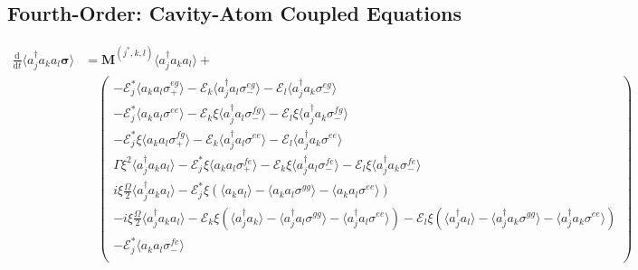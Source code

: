 \documentclass{article}
\newcommand{\ddt}{\frac{\mathrm{d}}{\mathrm{d}t}}
\begin{document}
\subsection{Fourth-Order: Cavity-Atom Coupled Equations}

\begin{subequations}
\begin{align}
	\ddt \langle a^{\dagger}_{j} a_{k} a_{l} \bm{\sigma} \rangle &= \bm{M}^{(j^{*}, k, l)} \langle a^{\dagger}_{j} a_{k} a_{l} \rangle + \nonumber \\
	&\quad
	\begin{pmatrix}
		-\mathcal{E}_{j}^{*} \langle a_{k} a_{l} \sigma^{eg}_{+} \rangle - \mathcal{E}_{k} \langle a^{\dagger}_{j} a_{l} \sigma^{eg}_{-} \rangle - \mathcal{E}_{l} \langle a^{\dagger}_{j} a_{k} \sigma^{eg}_{-} \rangle \\
		-\mathcal{E}_{j}^{*} \langle a_{k} a_{l} \sigma^{ee} \rangle - \mathcal{E}_{k} \xi \langle a^{\dagger}_{j} a_{l} \sigma^{fg}_{-} \rangle - \mathcal{E}_{l} \xi \langle a^{\dagger}_{j} a_{k} \sigma^{fg}_{-} \rangle \\
		-\mathcal{E}_{j}^{*} \xi \langle a_{k} a_{l} \sigma^{fg}_{+} \rangle - \mathcal{E}_{k} \langle a^{\dagger}_{j} a_{l} \sigma^{ee} \rangle - \mathcal{E}_{l} \langle a^{\dagger}_{j} a_{k} \sigma^{ee} \rangle \\
		\Gamma \xi^{2} \langle a^{\dagger}_{j} a_{k} a_{l} \rangle - \mathcal{E}_{j}^{*} \xi \langle a_{k} a_{l} \sigma^{fe}_{+} \rangle - \mathcal{E}_{k} \xi \langle a^{\dagger}_{j} a_{l} \sigma^{fe}_{-} \rangle - \mathcal{E}_{l} \xi \langle a^{\dagger}_{j} a_{k} \sigma^{fe}_{-} \rangle \\
		i \xi \frac{\Omega}{2} \langle a^{\dagger}_{j} a_{k} a_{l} \rangle - \mathcal{E}_{j}^{*} \xi \left( \langle a_{k} a_{l} \rangle - \langle a_{k} a_{l} \sigma^{gg} \rangle - \langle a_{k} a_{l} \sigma^{ee} \rangle \right) \\
		-i \xi \frac{\Omega}{2} \langle a^{\dagger}_{j} a_{k} a_{l} \rangle - \mathcal{E}_{k} \xi \left( \langle a^{\dagger}_{j} a_{k} \rangle - \langle a^{\dagger}_{j} a_{l} \sigma^{gg} \rangle - \langle a^{\dagger}_{j} a_{l} \sigma^{ee} \rangle \right) - \mathcal{E}_{l} \xi \left( \langle a^{\dagger}_{j} a_{l} \rangle - \langle a^{\dagger}_{j} a_{k} \sigma^{gg} \rangle - \langle a^{\dagger}_{j} a_{k} \sigma^{ee} \rangle \right) \\
		-\mathcal{E}_{j}^{*} \langle a_{k} a_{l} \sigma^{fe}_{-} \rangle \\

\end{pmatrix}
\end{align}
\end{subequations}
\end{document}

